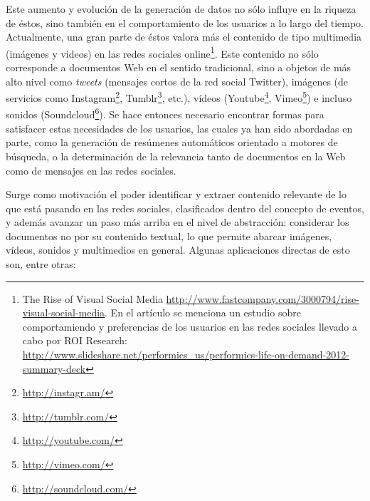    Este aumento y evolución de la generación de datos no sólo influye en la
   riqueza de éstos, sino también en el comportamiento de los usuarios
   a lo largo del tiempo. Actualmente,  una gran parte de éstos valora
   más el contenido de tipo multimedia (imágenes y videos)
   en las redes sociales online\footnote{The Rise of Visual Social Media \href{http://www.fastcompany.com/3000794/rise-visual-social-media}{http://www.fastcompany.com/3000794/rise-visual-social-media}. En el artículo se menciona un estudio sobre comportamiendo y preferencias de los usuarios en las redes sociales llevado a cabo por ROI Research: \href{http://www.slideshare.net/performics_us/performics-life-on-demand-2012-summary-deck}{http://www.slideshare.net/performics\_us/performics-life-on-demand-2012-summary-deck} }.
   Este contenido no sólo corresponde a documentos Web en el sentido
   tradicional, sino a objetos de más alto nivel como \emph{tweets}
   (mensajes cortos de la red social Twitter), imágenes (de servicios
   como Instagram\footnote{\href{http://instagr.am/}{http://instagr.am/} },
   Tumblr\footnote{\href{http://tumblr.com/}{http://tumblr.com/} }, etc.), vídeos
   (Youtube\footnote{\href{http://youtube.com/}{http://youtube.com/} }, Vimeo\footnote{\href{http://vimeo.com/}{http://vimeo.com/} }) e
   incluso sonidos (Soundcloud\footnote{\href{http://soundcloud.com/}{http://soundcloud.com/} }).
   Se hace entonces necesario encontrar formas para satisfacer estas
   necesidades de los usuarios, las cuales ya han sido
   abordadas en parte, como la generación de
   resúmenes automáticos orientado a motores de búsqueda, o la
   determinación de la relevancia tanto de documentos en la Web como de
   mensajes en las redes sociales.

   Surge como motivación el poder identificar y extraer contenido
   relevante de lo que está pasando en las redes sociales,
   clasificados dentro del concepto de eventos, y además avanzar un
   paso más arriba en el nivel de abstracción: considerar los
   documentos no por su contenido textual, lo que permite abarcar
   imágenes, vídeos, sonidos y multimedios en general. Algunas
   aplicaciones directas de esto son, entre otras:

